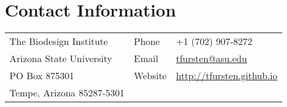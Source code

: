 \documentclass[11pt]{article}
\begin{document}
\section*{Contact Information}
\begin{tabular}[c]{p{3.5in}ll}
The Biodesign Institute& Phone & +1 (702) 907-8272\\
Arizona State University& Email & \href{mailto:tfursten@asu.edu}{tfursten@asu.edu}\\
PO Box 875301 & Website & \href{http://tfursten.github.io}{http://tfursten.github.io}\\
Tempe, Arizona 85287-5301&&\\
\end{tabular}


\end{document}
